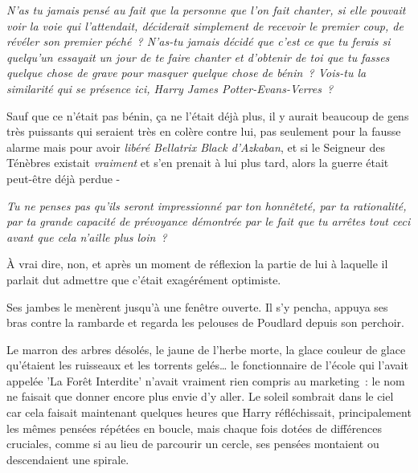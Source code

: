 \emph{N'as tu jamais pensé au fait que la personne que l'on fait chanter, si elle pouvait voir la voie qui l'attendait, déciderait simplement de recevoir le premier coup, de révéler son premier péché~? N'as-tu jamais décidé que c'est ce que tu ferais si quelqu'un essayait un jour de te faire chanter et d'obtenir de toi que tu fasses quelque chose de grave pour masquer quelque chose de bénin~? Vois-tu la similarité qui se présence ici, Harry James Potter-Evans-Verres~?}

Sauf que ce n'était pas bénin, ça ne l'était déjà plus, il y aurait beaucoup de gens très puissants qui seraient très en colère contre lui, pas seulement pour la fausse alarme mais pour avoir \emph{libéré Bellatrix Black d'Azkaban}, et si le Seigneur des Ténèbres existait \emph{vraiment} et s'en prenait à lui plus tard, alors la guerre était peut-être déjà perdue -

\emph{Tu ne penses pas qu'ils seront impressionné par ton honnêteté, par ta rationalité, par ta grande capacité de prévoyance démontrée par le fait que tu arrêtes tout ceci avant que cela n'aille plus loin~?}

À vrai dire, non, et après un moment de réflexion la partie de lui à laquelle il parlait dut admettre que c'était exagérément optimiste.

Ses jambes le menèrent jusqu'à une fenêtre ouverte. Il s'y pencha, appuya ses bras contre la rambarde et regarda les pelouses de Poudlard depuis son perchoir.

Le marron des arbres désolés, le jaune de l'herbe morte, la glace couleur de glace qu'étaient les ruisseaux et les torrents gelés… le fonctionnaire de l'école qui l'avait appelée 'La Forêt Interdite' n'avait vraiment rien compris au marketing~: le nom ne faisait que donner encore plus envie d'y aller. Le soleil sombrait dans le ciel car cela faisait maintenant quelques heures que Harry réfléchissait, principalement les mêmes pensées répétées en boucle, mais chaque fois dotées de différences cruciales, comme si au lieu de parcourir un cercle, ses pensées montaient ou descendaient une spirale.

